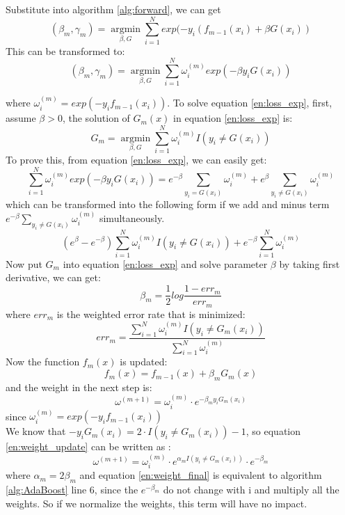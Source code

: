 Substitute into algorithm \ref{alg:forward},  we can get
\begin{equation}
(\beta_m, \gamma_m)=\underset{\beta, G}{\operatorname{argmin}}\sum_{i=1}^{N}exp(-y_i(f_{m-1}(x_i)+\beta G(x_i)) 
\end{equation}
This can be transformed to:
\begin{equation}\label{en:loss_exp}
(\beta_m, \gamma_m)=\underset{\beta, G}{\operatorname{argmin}}\sum_{i=1}^{N}\omega_i^{(m)}exp(-\beta y_i G(x_i)) 
\end{equation}

where $\omega_i^{(m)}=exp(-y_if_{m-1}(x_i))$. To solve equation \ref {en:loss_exp},  first,  assume $\beta>0$,  the solution of $G_m(x)$ in equation \ref{en:loss_exp} is:
\begin{equation}
G_m=\underset{\beta, G}{\operatorname{argmin}}\sum_{i=1}^{N}\omega_i^{(m)}I(y_i\neq G(x_i)) 
\end{equation} 
To prove this,  from equation \ref{en:loss_exp},  we can easily get:
\begin{equation}
\sum_{i=1}^{N}\omega_i^{(m)}exp(-\beta y_i G(x_i))=e^{-\beta}\sum_{y_i=G(x_i)}\omega_i^{(m)}+e^{\beta}\sum_{y_i\neq G(x_i)}\omega_i^{(m)}
\end{equation}
which can be transformed into the following form if we add and minus term $e^{-\beta} \sum_{y_i \neq G(x_i)}\omega_i^{(m)}$ simultaneously.
\begin{equation}
(e^\beta-e^{-\beta})\sum_{i=1}^{N}\omega_i^{(m)}I(y_i \neq G(x_i))+e^{-\beta}\sum_{i=1}^{N}\omega_i^{(m)}
\end{equation}
Now put $G_m$ into equation \ref{en:loss_exp} and solve parameter $\beta$ by taking first derivative,  we can get:
\begin{equation}
\beta_m=\frac{1}{2}log\frac{1-err_m}{err_m}
\end{equation}
where $err_m$ is the weighted error rate that is minimized:
\begin{equation}
err_m=\frac{\sum_{i=1}^{N}\omega_i^{(m)}I(y_i\neq G_m(x_i))}{\sum_{i=1}^{N}\omega_i^{(m)}}
\end{equation}
Now the function $f_m(x)$ is updated:
\begin{equation}
f_m(x)=f_{m-1}(x)+\beta_mG_m(x)
\end{equation}
and the weight in the next step is:
\begin{equation}\label {en:weight_update}
\omega^{(m+1)}=\omega_i^{(m)}\cdot e^{-\beta_my_iG_m(x_i)}
\end{equation}
since  $\omega_i^{(m)}=exp(-y_if_{m-1}(x_i))$\\
We know that $-y_iG_m(x_i)=2\cdot I(y_i\neq G_m(x_i))-1$,  so equation \ref{en:weight_update} can be written as :
\begin{equation}\label{en:weight_final}
\omega^{(m+1)}=\omega_i^{(m)}\cdot e^{\alpha_mI(y_i \neq G_m(x_i))}\cdot e^{-\beta_m}
\end{equation}
where $\alpha_m=2\beta_m$ and equation \ref{en:weight_final} is equivalent to algorithm \ref{alg:AdaBoost} line 6,  since the $e^{-\beta_m}$ do not change with i and multiply all the weights. So if we normalize the weights,  this term will have no impact. 



